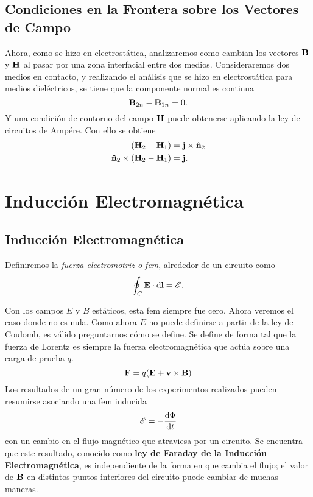 \section{Condiciones en la Frontera sobre los Vectores de Campo}
Ahora, como se hizo en electrostática, analizaremos como cambian los vectores $\vb{B}$ y $\vb{H}$ al pasar por una zona interfacial entre dos medios. Consideraremos dos medios en contacto, y realizando el análisis que se hizo en electrostática para medios dieléctricos, se tiene que la componente normal es continua
\begin{equation}
    \vb{B} _{2n} - \vb{B} _{1n} = 0.
\end{equation}
Y una condición de contorno del campo $\vb{H}$ puede obtenerse aplicando la ley de circuitos de Ampére. Con ello se obtiene
\begin{align}
    \qty(\vb{H}_2 - \vb{H}_1) &= \vb{j} \times \vu{n}_2 \\
    \vu{n} _2 \times \qty(\vb{H} _2 - \vb{H} _1) &= \vb{j}.
\end{align}




\chapter{Inducción Electromagnética}
\section{Inducción Electromagnética}
\begin{tcolorbox}
    Definiremos la \textit{fuerza electromotriz o fem}, alrededor de un circuito como
    \begin{equation}
        \oint _C \vb{E} \cdot \dd{\vb{l}} = \mathscr{E}.
    \end{equation}
\end{tcolorbox}
Con los campos $E$ y $B$ estáticos, esta fem siempre fue cero. Ahora veremos el caso donde no es nula. Como ahora $E$ no puede definirse a partir de la ley de Coulomb, es válido preguntarnos cómo se define. Se define de forma tal que la fuerza de Lorentz es siempre la fuerza electromagnética que actúa sobre una carga de prueba $q$.
\begin{equation}
    \vb{F} = q\qty(\vb{E} + \vb{v} \times \vb{B})
\end{equation}
Los resultados de un gran número de los experimentos realizados pueden resumirse asociando una fem inducida
\begin{equation}
    \mathscr{E} = -\dv{\Phi}{t}
\end{equation}
con un cambio en el flujo magnético que atraviesa por un circuito. Se encuentra que este resultado, conocido como \textbf{ley de Faraday de la Inducción Electromagnética}, es independiente de la forma en que cambia el flujo; el valor de $\vb{B}$ en distintos puntos interiores del circuito puede cambiar de muchas maneras. \\

